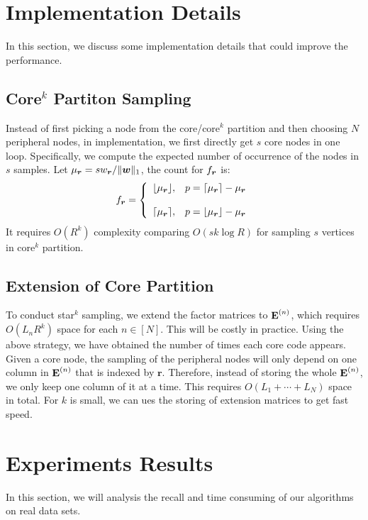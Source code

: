 \documentclass[letterpaper]{article}
\newcommand{\V}[1]{{\boldsymbol{{\MakeLowercase{#1}}}}}
\newcommand{\M}[1]{{\textbf{{\MakeUppercase{#1}}}}}
\newcommand{\FacMat}[2]{\M{#1}^{(#2)}}
\newcommand{\norm}[2]{\|#1\|_{#2}}
\begin{document}
\section{Implementation Details}
In this section, we discuss some implementation details that could improve the performance.

\subsection{Core$^k$ Partiton Sampling}
Instead of first picking a node from the core/core$^k$ partition 
and then choosing $N$ peripheral nodes, 
in implementation, we first directly get $s$ core nodes in one loop. 
Specifically, we compute the expected number of occurrence of the nodes in $s$ samples. 
Let $\mu_{\V{r}}=sw_\V{r}/\norm{\V{w}}{1}$, the count for $f_\V{r}$ is:
\begin{equation*}f_\V{r}=
    \left\{
      \begin{array}{ll}
        \lfloor \mu_{\V{r}} \rfloor,
        & \hbox{$p=\lceil \mu_{\V{r}} \rceil - \mu_{\V{r}}$} \\\\
        \lceil \mu_{\V{r}} \rceil,
        & \hbox{$p=\lfloor \mu_{\V{r}} \rfloor - \mu_{\V{r}}$}
      \end{array}
    \right.
\end{equation*}
It requires $O(R^k)$ complexity comparing $O(sk\log{R})$
for sampling $s$ vertices in core$^k$ partition.
\subsection{Extension of Core Partition}
To conduct star$^k$ sampling, 
we extend the factor matrices to $\FacMat{E}{n}$,
which requires $O(L_nR^k)$ space for each $n\in[N]$.
This will be costly in practice. 
Using the above strategy, we have obtained the number of times each core code appears. 
Given a core node, the sampling of the peripheral nodes 
will only depend on one column in $\FacMat{E}{n}$ that is indexed by $\boldsymbol{r}$. 
Therefore, instead of storing the whole $\FacMat{E}{n}$, 
we only keep one column of it at a time. 
This requires $O(L_1+\cdots+L_N)$ space in total.
For $k$ is small, we can ues the storing of extension matrices to get fast speed.
\section{Experiments Results}
In this section, we will analysis the recall
and time consuming of our algorithms on real data sets.
\end{document}
